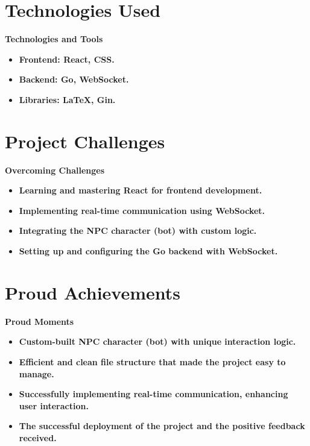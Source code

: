 \documentclass{beamer}
\begin{document}
\section{Technologies Used}

\begin{frame}{\bfseries Technologies and Tools}
    \begin{itemize}
        \item \bfseries Frontend: React, CSS.
        \item \bfseries Backend: Go, WebSocket.
        \item \bfseries Libraries: LaTeX, Gin.
    \end{itemize}
\end{frame}

\section{Project Challenges}

\begin{frame}{\bfseries Overcoming Challenges}
    \begin{itemize}
        \item \bfseries Learning and mastering React for frontend development.
        \item \bfseries Implementing real-time communication using WebSocket.
        \item \bfseries Integrating the NPC character (bot) with custom logic.
        \item \bfseries Setting up and configuring the Go backend with WebSocket.
    \end{itemize}
\end{frame}

\section{Proud Achievements}

\begin{frame}{\bfseries Proud Moments}
    \begin{itemize}
        \item \bfseries Custom-built NPC character (bot) with unique interaction logic.
        \item \bfseries Efficient and clean file structure that made the project easy to manage.
        \item \bfseries Successfully implementing real-time communication, enhancing user interaction.
        \item \bfseries The successful deployment of the project and the positive feedback received.
    \end{itemize}
\end{frame}
\end{document}
